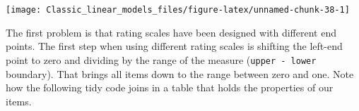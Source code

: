 \documentclass[]{svmono}
\newenvironment{Shaded}{\begin{snugshade}}{\end{snugshade}}
\newcommand{\KeywordTok}[1]{\textcolor[rgb]{0.13,0.29,0.53}{\textbf{#1}}}
\newcommand{\DataTypeTok}[1]{\textcolor[rgb]{0.13,0.29,0.53}{#1}}
\newcommand{\DecValTok}[1]{\textcolor[rgb]{0.00,0.00,0.81}{#1}}
\newcommand{\StringTok}[1]{\textcolor[rgb]{0.31,0.60,0.02}{#1}}
\newcommand{\OperatorTok}[1]{\textcolor[rgb]{0.81,0.36,0.00}{\textbf{#1}}}
\newcommand{\NormalTok}[1]{#1}
\begin{document}
\begin{Shaded}
\end{Shaded}

\begin{Shaded}
\end{Shaded}

\texttt{[image: Classic\_linear\_models\_files/figure-latex/unnamed-chunk-38-1]}

The first problem is that rating scales have been designed with
different end points. The first step when using different rating scales
is shifting the left-end point to zero and dividing by the range of the
measure (\texttt{upper\ -\ lower} boundary). That brings all items down
to the range between zero and one. Note how the following tidy code
joins in a table that holds the properties of our items.
\end{document}
